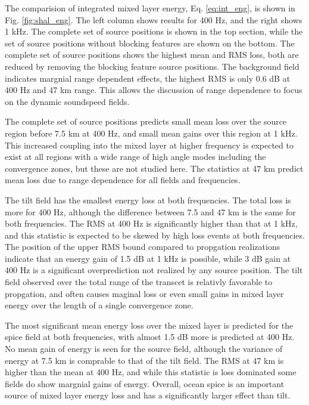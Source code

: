 \documentclass[preprint,NumberedRefs]{JASA}
\begin{document}
The comparision of integrated mixed layer energy, Eq. \eqref{eq:int_eng}, is shown in Fig. \ref{fig:shal_eng}. The left column shows results for 400 Hz, and the right shows 1 kHz. The complete set of source positions is shown in the top section, while the set of source positions without blocking features are shown on the bottom. The complete set of source positions shows the highest mean and RMS loss, both are reduced by removing the blocking feature source positions. The background field indicates margnial range dependent effects, the highest RMS is only 0.6 dB at 400 Hz and 47 km range. This allows the discussion of range dependence to focus on the dynamic soundspeed fields.

The complete set of source positions predicts small mean loss over the source region before 7.5 km at 400 Hz, and small mean gains over this region at 1 kHz. This increased coupling into the mixed layer at higher frequency is expected to exist at all regions with a wide range of high angle modes including the convergence zones, but these are not studied here. The statistics at 47 km predict mean loss due to range dependence for all fields and frequencies.

The tilt field has the smallest energy loss at both frequencies. The total loss is more for 400 Hz, although the difference between 7.5 and 47 km is the same for both frequencies. The RMS at 400 Hz is significantly higher than that at 1 kHz, and this statistic is expected to be skewed by high loss events at both frequencies. The position of the upper RMS bound compared to propgation realizations indicate that an energy gain of 1.5 dB at 1 kHz is possible, while 3 dB gain at 400 Hz is a significant overprediction not realized by any source position. The tilt field observed over the total range of the transcet is relativly favorable to propgation, and often causes maginal loss or even small gains in mixed layer energy over the length of a single convergence zone.

The most significant mean energy loss over the mixed layer is predicted for the spice field at both frequencies, with almost 1.5 dB more is predicted at 400 Hz. No mean gain of energy is seen for the source field, although the variance of energy at 7.5 km is comprable to that of the tilt field. The RMS at 47 km is higher than the mean at 400 Hz, and while this statistic is loss dominated some fields do show margnial gains of energy. Overall, ocean spice is an important source of mixed layer energy loss and has a significantly larger effect than tilt.
\end{document}
